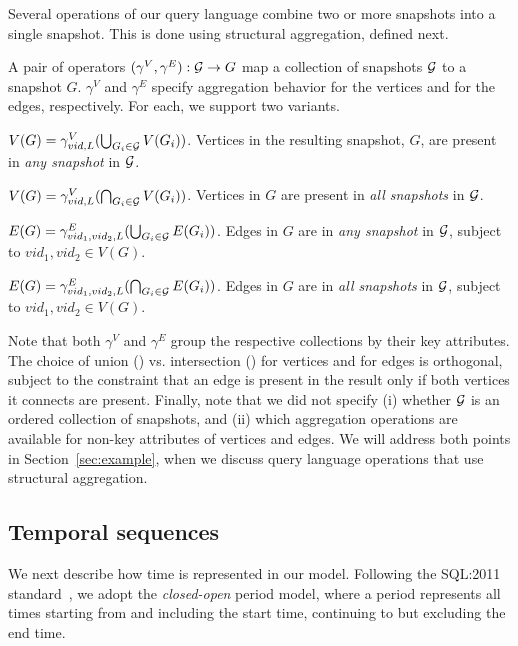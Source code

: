 Several operations of our query language combine two or more snapshots
into a single snapshot. This is done using structural aggregation,
defined next.

\begin{definition}   
A pair of operators $(\gamma^{V}, \gamma^{E}) : {\cal G} \rightarrow
G$ map a collection of snapshots $\cal{G}$ to a snapshot $G$.
$\gamma^{V}$ and $\gamma^{E}$ specify aggregation behavior for the
vertices and for the edges, respectively.  For each, we support two
variants.

\insql{[Any V]} $V(G) = \gamma^{V}_{vid, L}(\bigcup_{G_i \in {\cal G}} V(G_i))$.
Vertices in the resulting snapshot, $G$, are present in {\em any
  snapshot} in ${\cal G}$.

\insql{[All V]} $V(G) = \gamma^{V}_{vid, L}(\bigcap_{G_i \in {\cal G}} V(G_i))$.
Vertices in $G$ are present in {\em all snapshots} in ${\cal G}$.

\insql{[Any E]} $E(G) = \gamma^{E}_{vid_1,vid_2, L}(\bigcup_{G_i \in {\cal G}} E(G_i))$.
  Edges in $G$ are in {\em any snapshot} in ${\cal G}$,
  subject to $vid_1, vid_2 \in V(G)$.

\insql{[All E]} $E(G) = \gamma^{E}_{vid_1,vid_2, L}(\bigcap_{G_i \in
  {\cal G}} E(G_i))$.  Edges in $G$ are in {\em all snapshots} in
${\cal G}$, subject to $vid_1, vid_2 \in V(G)$.

\label{def:sgroup}
\end{definition}

Note that both $\gamma^{V}$ and $\gamma^{E}$ group the respective
collections by their key attributes.  The choice of union
() vs. intersection () for vertices and for
edges is orthogonal, subject to the constraint that an edge is present
in the result only if both vertices it connects are present.  Finally,
note that we did not specify (i) whether ${\cal G}$ is an ordered
collection of snapshots, and (ii) which aggregation operations are
available for non-key attributes of vertices and edges.  We will
address both points in Section~\ref{sec:example}, when we discuss
query language operations that use structural aggregation.

\subsection{Temporal sequences}
\label{sec:model:time}

We next describe how time is represented in our model.  Following the
SQL:2011 standard~\cite{DBLP:journals/sigmod/KulkarniM12}, we adopt
the {\em closed-open} period model, where a period represents all
times starting from and including the start time, continuing to but
excluding the end time.

